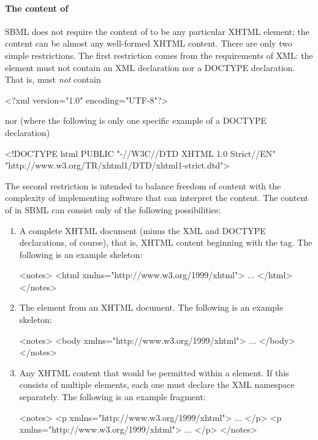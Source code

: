 \paragraph{The content of }

SBML does not require the content of  to be any
particular XHTML element; the content can be almost any
well-formed XHTML content.  There are only two simple
restrictions.  The first restriction comes from the requirements
of XML: the  element must not contain an XML
declaration nor a DOCTYPE declaration.  That is, 
must \emph{not} contain

\begin{example}
<?xml version="1.0" encoding="UTF-8"?>  
\end{example}

nor (where the following is only one specific example of a
DOCTYPE declaration)

\begin{example}
<!DOCTYPE html PUBLIC "-//W3C//DTD XHTML 1.0 Strict//EN"
 "http://www.w3.org/TR/xhtml1/DTD/xhtml1-strict.dtd">
\end{example}

The second restriction is intended to balance freedom of content
with the complexity of implementing software that can interpret
the content.  The content of  in SBML can consist
only of the following possibilities:
\begin{enumerate}
  
\item A complete XHTML document (minus the XML and DOCTYPE
  declarations, of course), that is, XHTML content beginning with
  the  tag.  The following is an example skeleton:
  \begin{example}
<notes>
    <html xmlns="http://www.w3.org/1999/xhtml">
      ...
    </html>
</notes>\end{example}

\item The  element from an XHTML document.  The
  following is an example skeleton:
  \begin{example}
<notes>
    <body xmlns="http://www.w3.org/1999/xhtml">
      ...
    </body>
</notes>\end{example}
  
\item Any XHTML content that would be permitted within a
   element.  If this consists of multiple
  elements, each one must declare the XML namespace separately.
  The following is an example fragment:
  \begin{example}
<notes>
    <p xmlns="http://www.w3.org/1999/xhtml">
      ...
    </p>
    <p xmlns="http://www.w3.org/1999/xhtml">
      ...
    </p>
</notes>\end{example}

\end{enumerate}

